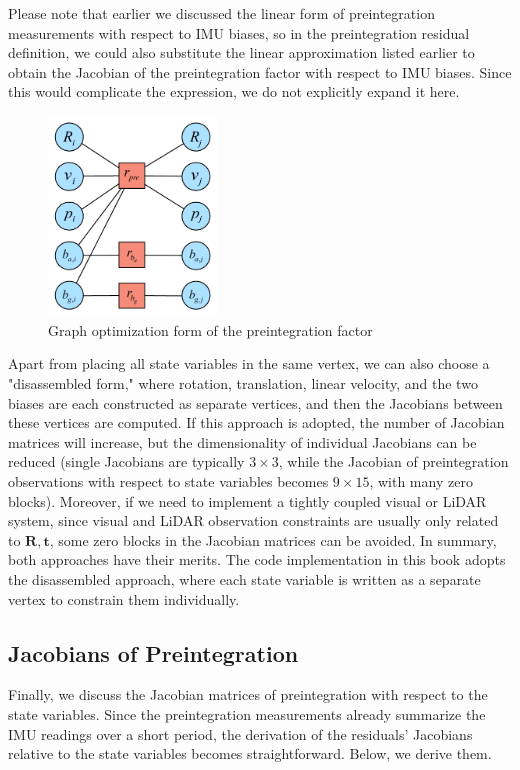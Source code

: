 Please note that earlier we discussed the linear form of preintegration measurements with respect to IMU biases, so in the preintegration residual definition, we could also substitute the linear approximation listed earlier to obtain the Jacobian of the preintegration factor with respect to IMU biases. Since this would complicate the expression, we do not explicitly expand it here.

\begin{figure}[!htp]
	\centering
	\includegraphics[width=0.4\textwidth]{resources/preintegration/preintegration-residual-graph.pdf}
	\caption{Graph optimization form of the preintegration factor}
	\label{fig:preintegration-residual-graph}
\end{figure}

Apart from placing all state variables in the same vertex, we can also choose a "disassembled form," where rotation, translation, linear velocity, and the two biases are each constructed as separate vertices, and then the Jacobians between these vertices are computed. If this approach is adopted, the number of Jacobian matrices will increase, but the dimensionality of individual Jacobians can be reduced (single Jacobians are typically $3 \times 3$, while the Jacobian of preintegration observations with respect to state variables becomes $9 \times 15$, with many zero blocks). Moreover, if we need to implement a tightly coupled visual or LiDAR system, since visual and LiDAR observation constraints are usually only related to $\mathbf{R}, \mathbf{t}$, some zero blocks in the Jacobian matrices can be avoided. In summary, both approaches have their merits. The code implementation in this book adopts the disassembled approach, where each state variable is written as a separate vertex to constrain them individually.

\subsection{Jacobians of Preintegration}  
\label{sec:preinteg-jacobians}  
Finally, we discuss the Jacobian matrices of preintegration with respect to the state variables. Since the preintegration measurements already summarize the IMU readings over a short period, the derivation of the residuals' Jacobians relative to the state variables becomes straightforward. Below, we derive them.  

